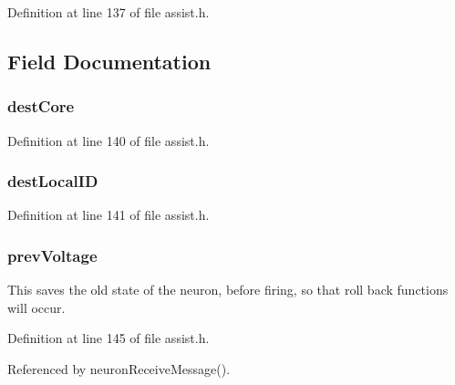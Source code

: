 Definition at line 137 of file assist.\+h.



\subsection{Field Documentation}
\hypertarget{struct_msg___data_a0ce9b87ee4780bfc676814cf8d485a97}{}
\subsubsection[{dest\+Core}]{ dest\+Core}\label{struct_msg___data_a0ce9b87ee4780bfc676814cf8d485a97}


Definition at line 140 of file assist.\+h.

\hypertarget{struct_msg___data_aa0359599db6f5e6c68ac2b7123b4147a}{}
\subsubsection[{dest\+Local\+I\+D}]{ dest\+Local\+I\+D}\label{struct_msg___data_aa0359599db6f5e6c68ac2b7123b4147a}


Definition at line 141 of file assist.\+h.

\hypertarget{struct_msg___data_a20818fc301603eac9d3685ba53424699}{}
\subsubsection[{prev\+Voltage}]{ prev\+Voltage}\label{struct_msg___data_a20818fc301603eac9d3685ba53424699}


This saves the old state of the neuron, before firing, so that roll back functions will occur. 



Definition at line 145 of file assist.\+h.



Referenced by neuron\+Receive\+Message().

